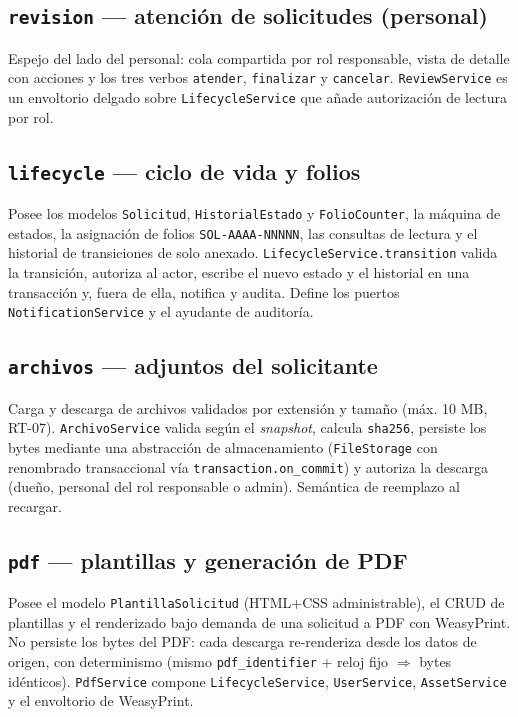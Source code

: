 \documentclass[12pt,letterpaper]{report}
\begin{document}
\subsection{\texttt{revision} — atención de solicitudes (personal)}
Espejo del lado del personal: cola compartida por rol responsable, vista de
detalle con acciones y los tres verbos \texttt{atender}, \texttt{finalizar} y
\texttt{cancelar}. \texttt{ReviewService} es un envoltorio delgado sobre
\texttt{LifecycleService} que añade autorización de lectura por rol.

\subsection{\texttt{lifecycle} — ciclo de vida y folios}
Posee los modelos \texttt{Solicitud}, \texttt{HistorialEstado} y
\texttt{FolioCounter}, la máquina de estados, la asignación de folios
\texttt{SOL-AAAA-NNNNN}, las consultas de lectura y el historial de transiciones
de solo anexado. \texttt{LifecycleService.transition} valida la transición,
autoriza al actor, escribe el nuevo estado y el historial en una transacción y,
fuera de ella, notifica y audita. Define los puertos \texttt{NotificationService}
y el ayudante de auditoría.

\subsection{\texttt{archivos} — adjuntos del solicitante}
Carga y descarga de archivos validados por extensión y tamaño (máx. 10 MB,
RT-07). \texttt{ArchivoService} valida según el \textit{snapshot}, calcula
\texttt{sha256}, persiste los bytes mediante una abstracción de almacenamiento
(\texttt{FileStorage} con renombrado transaccional vía
\texttt{transaction.on\_commit}) y autoriza la descarga (dueño, personal del rol
responsable o admin). Semántica de reemplazo al recargar.

\subsection{\texttt{pdf} — plantillas y generación de PDF}
Posee el modelo \texttt{PlantillaSolicitud} (HTML+CSS administrable), el CRUD de
plantillas y el renderizado bajo demanda de una solicitud a PDF con WeasyPrint.
No persiste los bytes del PDF: cada descarga re-renderiza desde los datos de
origen, con determinismo (mismo \texttt{pdf\_identifier} + reloj fijo
$\Rightarrow$ bytes idénticos). \texttt{PdfService} compone
\texttt{LifecycleService}, \texttt{UserService}, \texttt{AssetService} y el
envoltorio de WeasyPrint.
\end{document}
